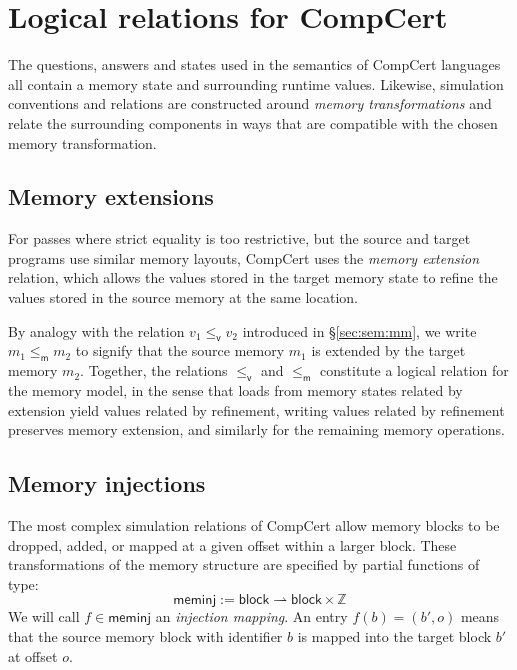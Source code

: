 \documentclass[sigplan,screen,review]{acmart}
\newcommand{\kw}[1]{\ensuremath{ \mathsf{#1} }}
\newcommand{\vref}{\le_\kw{v}}
\newcommand{\mext}{\le_\kw{m}}
\begin{document}


\section{Logical relations for CompCert} \label{sec:cklr} %

The questions, answers and states
used in the semantics of CompCert languages all contain
a memory state and surrounding runtime values.
Likewise, simulation conventions and relations
are constructed around \emph{memory transformations}
and relate the surrounding components in ways that
are compatible with the chosen memory transformation.

\subsection{Memory extensions} \label{sec:memext} %

For passes where strict equality is too restrictive,
but the source and target programs
use similar memory layouts,
CompCert uses the \emph{memory extension} relation,
which allows the values
stored in the target memory state to refine
the values stored in the source memory at the same location.

By analogy with
the relation $v_1 \vref v_2$
introduced in
\S\ref{sec:sem:mm},
we write $m_1 \mext m_2$ to signify that
the source memory $m_1$ is extended by
the target memory $m_2$.
Together,
the relations $\vref$ and $\mext$
constitute a logical relation for the memory model,
in the sense that
loads from memory states related by extension
yield values related by refinement,
writing values related by refinement
preserves memory extension,
and similarly for the remaining memory operations.


\subsection{Memory injections} \label{sec:meminj} %

The most complex simulation relations of CompCert
allow memory blocks to be dropped, added, or
mapped at a given offset within a larger block.
These transformations of the memory structure
are specified by partial functions of type:
\[
  \kw{meminj} := \kw{block} \rightharpoonup \kw{block} \times \mathbb{Z}
\]
We will call $f \in \kw{meminj}$
an \emph{injection mapping}.
An entry $f(b) = (b', o)$
means that the source memory block with identifier $b$
is mapped into the target block $b'$
at offset $o$.
\end{document}

